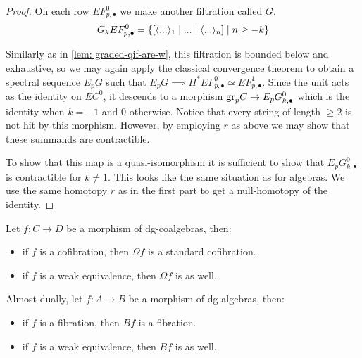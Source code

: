 \documentclass[../thesis.tex]{subfiles}
\begin{document}
\begin{proof}
                On each row $EF^0_{p,\bullet}$ we make another filtration called $G$.
                \begin{align*}
                    G_kEF^0_{p,\bullet} = \startset{[\langle ... \rangle_1 \mid ... \mid \langle ... \rangle_n] \mid n \geq -k}
                \end{align*}

                Similarly as in \ref{lem: graded-qif-are-w}, this filtration is bounded below and exhaustive, so we may again apply the classical convergence theorem to obtain a spectral sequence $E_pG$ such that $E_pG \implies H^*EF^0_{p,\bullet} \simeq EF^1_{p,\bullet}$. Since the unit acts as the identity on $EC^0$, it descends to a morphism $\tt{gr}_pC \rightarrow E_pG^0_{k,\bullet}$ which is the identity when $k = -1$ and $0$ otherwise. Notice that every string of length $\geq 2$ is not hit by this morphism. However, by employing $r$ as above we may show that these summands are contractible.

                To show that this map is a quasi-isomorphism it is sufficient to show that $E_pG^0_{k, \bullet}$ is contractible for $k \neq 1$. This looks like the same situation as for algebras. We use the same homotopy $r$ as in the first part to get a null-homotopy of the identity.
            \end{proof}

            \begin{lemma}\label{lem: bar-cobar-Quill-adj}
                Let $f: C\rightarrow D$ be a morphism of dg-coalgebras, then:
                \begin{itemize}
                    \item if $f$ is a cofibration, then $\Omega f$ is a standard cofibration.
                    \item if $f$ is a weak equivalence, then $\Omega f$ is as well.
                \end{itemize}

                Almost dually, let $f: A\rightarrow B$ be a morphism of dg-algebras, then:
                \begin{itemize}
                    \item if $f$ is a fibration, then $B f$ is a fibration.
                    \item if $f$ is a weak equivalence, then $B f$ is as well.
                \end{itemize}
            \end{lemma}
\end{document}

